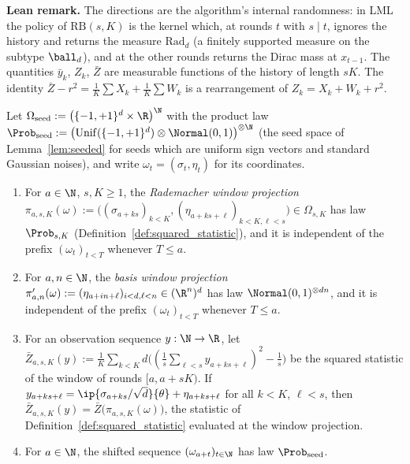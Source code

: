 \textbf{Lean remark.} The directions are the algorithm's internal randomness: in LML the
policy of $\mathrm{RB}(s,K)$ is the kernel which, at rounds $t$ with $s \mid t$, ignores the
history and returns the measure $\mathrm{Rad}_d$ (a finitely supported measure on the
subtype $\ball_d$), and at the other rounds returns the Dirac mass at $x_{t-1}$. The
quantities $\bar y_k$, $Z_k$, $\bar Z$ are measurable functions of the history of length
$sK$. The identity $\bar Z - r^2 = \frac1K\sum X_k + \frac1K\sum W_k$ is a rearrangement of
$Z_k = X_k + W_k + r^2$.

\begin{lemma}\label{lem:statistic_structure}
\leanok
{}
Let $\Omega_{\mathrm{seed}} := \big(\{-1,+1\}^d \times \R\big)^{\N}$ with the product law
$\Prob_{\mathrm{seed}} := \big(\mathrm{Unif}(\{-1,+1\}^d) \otimes \Normal(0,1)\big)^{\otimes\N}$
(the seed space of Lemma~\ref{lem:seeded} for seeds which are uniform sign vectors and
standard Gaussian noises), and write $\omega_t = (\sigma_t, \eta_t)$ for its coordinates.
\begin{enumerate}
  \item[(i)] For $a \in \N$, $s, K \ge 1$, the \emph{Rademacher window projection}
    $\pi_{a,s,K}(\omega) := \big( (\sigma_{a+ks})_{k<K}, (\eta_{a+ks+\ell})_{k<K,\ell<s} \big)
    \in \Omega_{s,K}$ has law $\Prob_{s,K}$ (Definition~\ref{def:squared_statistic}), and it
    is independent of the prefix $(\omega_t)_{t<T}$ whenever $T \le a$.
  \item[(ii)] For $a, n \in \N$, the \emph{basis window projection}
    $\pi'_{a,n}(\omega) := (\eta_{a+in+\ell})_{i<d,\ell<n} \in (\R^n)^d$ has law
    $\Normal(0,1)^{\otimes dn}$, and it is independent of the prefix $(\omega_t)_{t<T}$
    whenever $T \le a$.
  \item[(iii)] For an observation sequence $y : \N \to \R$, let
    $\bar Z_{a,s,K}(y) := \frac1K\sum_{k<K} d\big( (\frac1s\sum_{\ell<s} y_{a+ks+\ell})^2 - \frac1s \big)$
    be the squared statistic of the window of rounds $[a, a + sK)$. If
    $y_{a+ks+\ell} = \ip{\sigma_{a+ks}/\sqrt d}{\theta} + \eta_{a+ks+\ell}$ for all $k < K$,
    $\ell < s$, then $\bar Z_{a,s,K}(y) = \bar Z\big(\pi_{a,s,K}(\omega)\big)$, the statistic of
    Definition~\ref{def:squared_statistic} evaluated at the window projection.
  \item[(iv)] For $a \in \N$, the shifted sequence $(\omega_{a+t})_{t\in\N}$ has law
    $\Prob_{\mathrm{seed}}$.
\end{enumerate}
\end{lemma}


